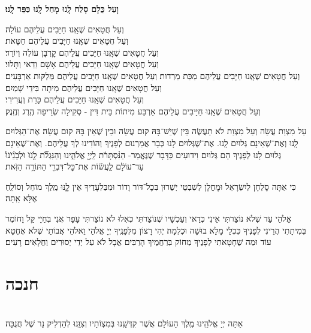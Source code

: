 \documentclass[twoside, openany, parskip=half, 11pt]{book}
\begin{document}
\textbf{וְעַל כֻּלָם סְלַח לָֽנוּ מְחַל לָֽנוּ כַּפֵּר לָֽנוּ׃}

וְעַל חֲטָאִים שֶׁאָֽנוּ חַיָּבִים עֲלֵיהֶם עוֹלָה׃\\
וְעַל חֲטָאִים שֶׁאָֽנוּ חַיָּבִים עֲלֵיהֶם חַטָּאת׃\\
וְעַל חֲטָאִים שֶׁאָֽנוּ חַיָּבִים עֲלֵיהֶם קׇרְבָּן עוֹלֶה וְיוֹרֵד׃\\
וְעַל חֲטָאִים שֶׁאָֽנוּ חַיָּבִים עֲלֵיהֶם אָשָׁם וַדַאי וְתָּלוּי׃\\
וְעַל חֲטָאִים שֶׁאָֽנוּ חַיָּבִים עֲלֵיהֶם מַכַּת מַרְדוּת׃
וְעַל חֲטָאִים שֶׁאָֽנוּ חַיָּבִים עֲלֵיהֶם מַּלְקּוּת אַרְבָּעִים׃\\
וְעַל חֲטָאִים שֶׁאָֽנוּ חַיָּבִים עֲלֵיהֶם מִיתָה בִּידֵי שָׁמַיִם׃\\
וְעַל חֲטָאִים שֶׁאָֽנוּ חַיָּבִים עֲלֵיהֶם כָּרֵת וְעֲרִירִי׃\\
וְעַל חֲטָאִים שֶׁאָֽנוּ חַיָּיבִים עֲלֵיהֶם אַרְבַּע מִיתוֹת בֵּית דִּין - סְקִילָה שְׂרֵיפָה הֶֽרֶג וְחֶֽנֶק׃

עַל מִצְוַת עֲשֵׂה וְעַל מִצְוַת לֹא תַעֲשֶׂה בֵּין שֶׁיֵשׁ־בָּהּ קוּם עֲשֵׂה וּבֵין שֶׁאֵין בָּהּ קוּם עֲשֵׂה׃ אֶת־הַגְּלוּיִם לָֽנוּ וְאֶת־שֶׁאֵינָם גְּלוּיִם לָֽנוּ. אֶת־שֶׁגְּלוּיִם לָנוּ כְּבָר אֲמַרְנוּם לְפָנֶיךָ וְהוֹדִינוּ לְךָ עֲלֵיהֶם. וְאֶת־שֶׁאֵינָם גְּלוּיִם לָנוּ לְפָנֶיךָ הֵם גְּלוּיִם וִידוּעִים כַּדָּבָר שֶׁנֶּאֱמַר- הַנִּ֨סְתָּרֹ֔ת
לַֽיְיָ֖ אֱלֹהֵ֑ינוּ וְהַנִּגְלֹ֞ת לָֹ֤נֹוֹּ וֹּלְֹבָֹנֵֹ֨יֹנֹוֹּ֙ עַד־עוֹלָ֔ם לַֽעֲשׂ֕וֹת אֶת־כׇּל־דִּבְרֵ֖י הַתּוֹרָ֥ה הַזֹּֽאת׃

כִּי אַתָּה סׇלְחָן לְיִשְׂרָאֵל וּמׇחֳלָן לְשִׁבְטֵי יְשֻׁרוּן בְּכׇל־דּוֹר וָדוֹר וּמִבַּלְעָדֶיךָ אֵין לׇׇֽנּוּ מֶֽלֶךְ מוֹחֵל וְסוֹלֵֽחַ אֶלָּא אַֽתָּה׃

אֱלֹהַי עַד שֶׁלֹא נוֹצַרתִּי אֵינִי כְּדַאי וְעַכְשָׁיו שֶׁנוֹצַרתִּי כְּאִלוּ לֹא נוֹצַרתִּי עָפָר אֲנִי בְּחַיָי קַּל וָחוֹמֶר בְּמִיתָתִי הֲרֵינִי לְפָּנֶיךָ כִּכְלֵי מָלֵא בוּשָׁה וּכְלִמָה׃ יְהִי רָצוֹן מִלְּפָנֶֽיךָ יְיָ אֱלֹהַי וֵאלֹהֵי אֲבוֹתַי שֶׁלֹא אֶחֱטָא עוֹד וּמַה שֶׁחָטָאתִי לְפָנֶיךָ מְחוֹק בְּרַחֲמֶיךָ הָרַבִּים אֲבָל לֹא עַל יְדֵי יְסוּרִים וַחֲלָאִים רָעִים׃

\vfill
\sepline

\chapter[חנכה]{ חנכה }
\label{chanukah}

\\
אַתָּה יְיָ אֱלֹהֵֽינוּ מֶֽלֶךְ הָעוֹלָם
אֲשֶׁר קִדְּשָֽׁנוּ בְּמִצְוֹתָיו וְצִוָּֽנוּ לְהַדְלִיק נֵר שֶׁל חֲנֻכָּה׃
\end{document}
